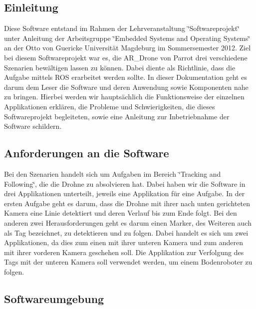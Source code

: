 

\subsection*{Einleitung}

Diese Software entstand im Rahmen der Lehrveranstaltung \char`\"{}Softwareprojekt\char`\"{} unter Anleitung der Arbeitsgruppe \char`\"{}Embedded Systems and Operating Systems\char`\"{} an der Otto von Guericke Universität Magdeburg im Sommersemester 2012. Ziel bei diesem Softwareprojekt war es, die AR\_\-Drone von Parrot drei verschiedene Szenarien bewältigen lassen zu können. Dabei diente als Richtlinie, dass die Aufgabe mittels ROS erarbeitet werden sollte. In dieser Dokumentation geht es darum dem Leser die Software und deren Anwendung sowie Komponenten nahe zu bringen. Hierbei werden wir hauptsächlich die Funktionsweise der einzelnen Applikationen erklären, die Probleme und Schwierigkeiten, die dieses Softwareprojekt begleiteten, sowie eine Anleitung zur Inbetriebnahme der Software schildern.

\subsection*{Anforderungen an die Software}

Bei den Szenarien handelt sich um Aufgaben im Bereich \char`\"{}Tracking and Following\char`\"{}, die die Drohne zu absolvieren hat. Dabei haben wir die Software in drei Applikationen unterteilt, jeweils eine Applikation für eine Aufgabe. In der ersten Aufgabe geht es darum, dass die Drohne mit ihrer nach unten gerichteten Kamera eine Linie detektiert und deren Verlauf bis zum Ende folgt. Bei den anderen zwei Herausforderungen geht es darum einen Marker, des Weiteren auch als Tag bezeichnet, zu detektieren und zu folgen. Dabei handelt es sich um zwei Applikationen, da dies zum einen mit ihrer unteren Kamera und zum anderen mit ihrer vorderen Kamera geschehen soll. Die Applikation zur Verfolgung des Tags mit der unteren Kamera soll verwendet werden, um einem Bodenroboter zu folgen.

\subsection*{Softwareumgebung}

